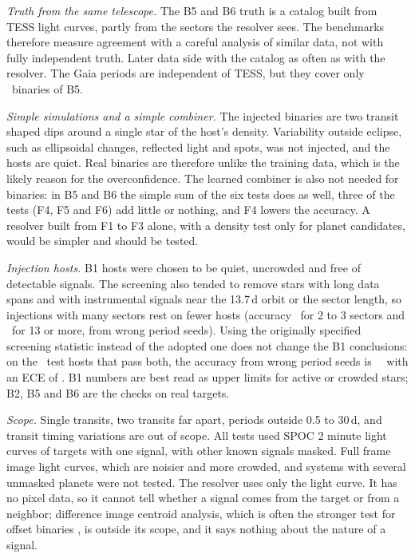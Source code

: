 \documentclass[twocolumn,linenumbers]{aastex701}
\begin{document}
\emph{Truth from the same telescope.} The B5 and B6 truth is a catalog built from TESS light curves, partly from the sectors the resolver sees. The benchmarks therefore measure agreement with a careful analysis of similar data, not with fully independent truth. Later data side with the catalog as often as with the resolver. The Gaia periods are independent of TESS, but they cover only \bFiveGaiaN\ binaries of B5.

\emph{Simple simulations and a simple combiner.} The injected binaries are two transit shaped dips around a single star of the host's density. Variability outside eclipse, such as ellipsoidal changes, reflected light and spots, was not injected, and the hosts are quiet. Real binaries are therefore unlike the training data, which is the likely reason for the overconfidence. The learned combiner is also not needed for binaries: in B5 and B6 the simple sum of the six tests does as well, three of the tests (F4, F5 and F6) add little or nothing, and F4 lowers the accuracy. A resolver built from F1 to F3 alone, with a density test only for planet candidates, would be simpler and should be tested.

\emph{Injection hosts.} B1 hosts were chosen to be quiet, uncrowded and free of detectable signals. The screening also tended to remove stars with long data spans and with instrumental signals near the 13.7\,d orbit or the sector length, so injections with many sectors rest on fewer hosts (accuracy \bOneStratLow\ for 2 to 3 sectors and \bOneStratHigh\ for 13 or more, from wrong period seeds). Using the originally specified screening statistic instead of the adopted one does not change the B1 conclusions: on the \rawHostsBoth\ test hosts that pass both, the accuracy from wrong period seeds is \rawBothWAcc\ \rawBothWAccCI\ with an ECE of \rawBothWEce. B1 numbers are best read as upper limits for active or crowded stars; B2, B5 and B6 are the checks on real targets.

\emph{Scope.} Single transits, two transits far apart, periods outside 0.5 to 30\,d, and transit timing variations are out of scope. All tests used SPOC 2 minute light curves of targets with one signal, with other known signals masked. Full frame image light curves, which are noisier and more crowded, and systems with several unmasked planets were not tested. The resolver uses only the light curve. It has no pixel data, so it cannot tell whether a signal comes from the target or from a neighbor; difference image centroid analysis, which is often the stronger test for offset binaries \citep{Twicken2018}, is outside its scope, and it says nothing about the nature of a signal.
\end{document}
